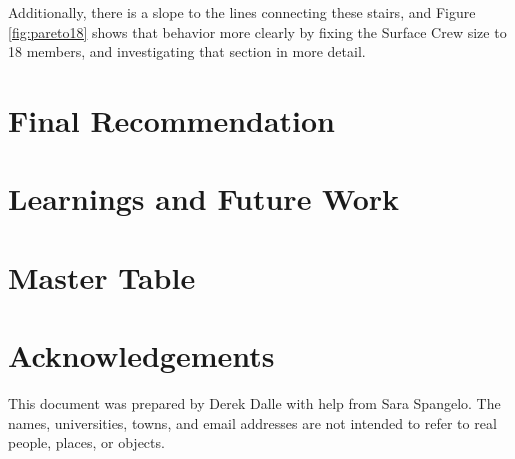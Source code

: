 \documentclass[]{aiaa-pretty}
\begin{document}
Additionally, there is a slope to the lines connecting these stairs, and Figure \ref{fig:pareto18} shows that behavior more clearly by fixing the Surface Crew size to 18 members, and investigating that section in more detail.

\section{Final Recommendation}


\section{Learnings and Future Work} 



\appendix
\section{Master Table}
\label{app:mastertab}


\section*{Acknowledgements}
This document was prepared by Derek Dalle with help from Sara Spangelo.  The names, universities, towns, and email addresses are not intended to refer to real people, places, or objects.



\end{document}

